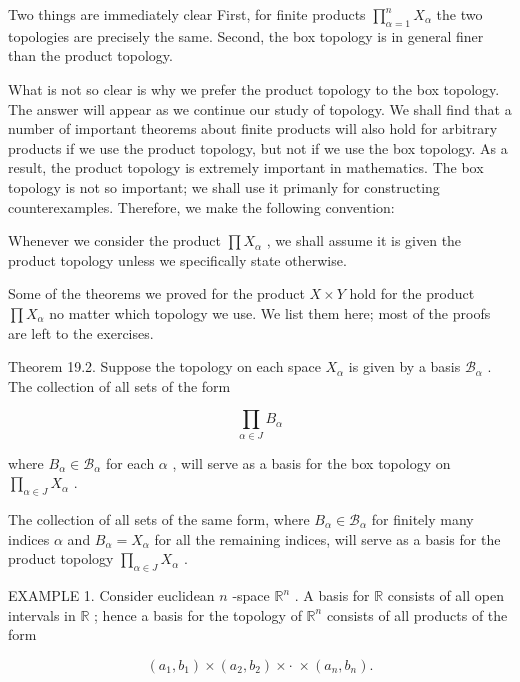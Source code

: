 \documentclass[10pt]{article}
\begin{document}
Two things are immediately clear First, for finite products \(\mathop{\prod }\limits_{{\alpha  = 1}}^{n}{X}_{\alpha }\) the two topologies are precisely the same. Second, the box topology is in general finer than the product topology.

What is not so clear is why we prefer the product topology to the box topology. The answer will appear as we continue our study of topology. We shall find that a number of important theorems about finite products will also hold for arbitrary products if we use the product topology, but not if we use the box topology. As a result, the product topology is extremely important in mathematics. The box topology is not so important; we shall use it primanly for constructing counterexamples. Therefore, we make the following convention:

Whenever we consider the product \(\prod {X}_{\alpha }\) , we shall assume it is given the product topology unless we specifically state otherwise.

Some of the theorems we proved for the product \(X \times  Y\) hold for the product \(\prod {X}_{\alpha }\) no matter which topology we use. We list them here; most of the proofs are left to the exercises.

Theorem 19.2. Suppose the topology on each space \({X}_{\alpha }\) is given by a basis \({\mathcal{B}}_{\alpha }\) . The collection of all sets of the form

\[
\mathop{\prod }\limits_{{\alpha  \in  J}}{B}_{\alpha }
\]

where \({B}_{\alpha } \in  {\mathcal{B}}_{\alpha }\) for each \(\alpha\) , will serve as a basis for the box topology on \(\mathop{\prod }\limits_{{\alpha  \in  J}}{X}_{\alpha }\) .

The collection of all sets of the same form, where \({B}_{\alpha } \in  {\mathcal{B}}_{\alpha }\) for finitely many indices \(\alpha\) and \({B}_{\alpha } = {X}_{\alpha }\) for all the remaining indices, will serve as a basis for the product topology \(\mathop{\prod }\limits_{{\alpha  \in  J}}{X}_{\alpha }\) .

EXAMPLE 1. Consider euclidean \(n\) -space \({\mathbb{R}}^{n}\) . A basis for \(\mathbb{R}\) consists of all open intervals in \(\mathbb{R}\) ; hence a basis for the topology of \({\mathbb{R}}^{n}\) consists of all products of the form

\[
\left( {{a}_{1},{b}_{1}}\right)  \times  \left( {{a}_{2},{b}_{2}}\right)  \times   \cdot  \; \times  \left( {{a}_{n},{b}_{n}}\right) .
\]
\end{document}

